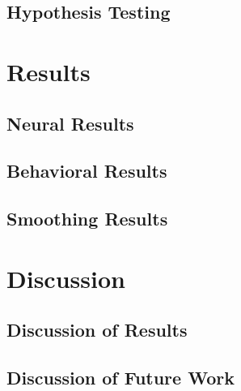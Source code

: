     \subsection{Hypothesis Testing}
                

\section{Results}

    \subsection{Neural Results}
            
    \subsection{Behavioral Results}
                
    \subsection{Smoothing Results}
                

\section{Discussion}

    \subsection{Discussion of Results}
            
    \subsection{Discussion of Future Work}
            





